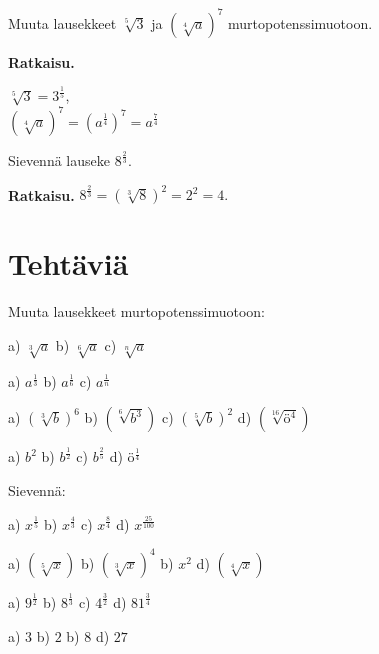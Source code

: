 \begin{esimerkki}
Muuta lausekkeet $\sqrt[5]{3}$ ja $(\sqrt[4]{a})^7$ murtopotenssimuotoon.

{\bf Ratkaisu.}

$\sqrt[5]{3} = 3^\frac{1}{5}$, \\
$(\sqrt[4]{a})^7 = (a^\frac{1}{4})^7=a^\frac{7}{4}$
\end{esimerkki}

\begin{esimerkki}
Sievennä lauseke $8^\frac{2}{3}$.

{\bf Ratkaisu.}
 $8^\frac{2}{3} = (\sqrt[3]{8})^2 = 2^2 = 4.$
\end{esimerkki}

\section*{Tehtäviä}

Muuta lausekkeet murtopotenssimuotoon:

\begin{tehtava}
a) $\sqrt[3]{a}$ \qquad
b) $\sqrt[6]{a}$ \qquad
c) $\sqrt[n]{a}$ 
\begin{vastaus}	
a) $a^\frac{1}{3}$ \qquad
b) $a^\frac{1}{6}$ \qquad
c) $a^\frac{1}{n}$ \qquad
\end{vastaus}
\end{tehtava}

\begin{tehtava}
a) $(\sqrt[3]{b})^6$ \qquad
b) $(\sqrt[6]{b^3})$ \qquad
c) $(\sqrt[5]{b})^2$ \qquad
d) $(\sqrt[16]{ö^4})$
\begin{vastaus}	
a) $b^2$ \qquad
b) $b^\frac{1}{2}$ \qquad
c) $b^\frac{2}{5}$ \qquad
d) $ö^\frac{1}{4}$
\end{vastaus}
\end{tehtava}

Sievennä:
\begin{tehtava}
a) $x^\frac{1}{5}$ \qquad
b) $x^\frac{4}{3}$ \qquad
c) $x^\frac{8}{4}$ \qquad
d) $x^\frac{25}{100}$ \qquad
\begin{vastaus}	
a) $(\sqrt[5]{x})$ \qquad
b) $(\sqrt[3]{x})^4$ \qquad
b) $x^2$ \qquad
d) $(\sqrt[4]{x})$ 
\end{vastaus}
\end{tehtava}

\begin{tehtava}
a) $9^\frac{1}{2}$ \qquad
b) $8^\frac{1}{3}$ \qquad
c) $4^\frac{3}{2}$ \qquad
d) $81^\frac{3}{4}$ \qquad
\begin{vastaus}	
a) $3$ \qquad
b) $2$ \qquad
b) $8$ \qquad
d) $27$ 
\end{vastaus}
\end{tehtava}

